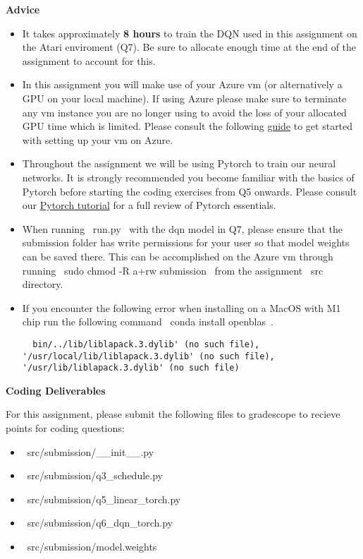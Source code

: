 \textbf{Advice}
\begin{itemize}
  \item It takes approximately \textbf{8 hours} to train the DQN used in this assignment on the Atari enviroment (Q7). Be sure to allocate enough time at the end of the assignment to account for this.

  \item In this assignment you will make use of your Azure vm (or alternatively a GPU on your local machine). If using Azure please make sure to terminate any vm instance you are no longer using to avoid the loss of your allocated GPU time which is limited. Please consult the following \href{https://github.com/scpd-proed/XCS234-Handouts/blob/main/Azure/Azure%20Guide.pdf}{guide} to get started with setting up your vm on Azure.
  
  \item Throughout the assignment we will be using Pytorch to train our neural networks. It is strongly recommended you become familiar with the basics of Pytorch before starting the coding exercises from Q5 onwards. Please consult our \href{https://colab.research.google.com/drive/1BZ89PnXpzN2US_OxwuQCazucmuTpuIfS?usp=sharing}{Pytorch tutorial} for a full review of Pytorch essentials.

  \item When running ~run.py~ with the dqn model in Q7, please ensure that the submission folder has write permissions for your user so that model weights can be saved there. This can be accomplished on the Azure vm through running ~sudo chmod -R a+rw submission~ from the assignment ~src~ directory.

  \item If you encounter the following error when installing on a MacOS with M1 chip run the following command ~conda install openblas~.

  \begin{lstlisting}
  bin/../lib/liblapack.3.dylib' (no such file), '/usr/local/lib/liblapack.3.dylib' (no such file), '/usr/lib/liblapack.3.dylib' (no such file)
  \end{lstlisting}
\end{itemize}


\textbf{Coding Deliverables}

For this assignment, please submit the following files to gradescope to recieve points for coding questions:
\begin{itemize}
    \item ~src/submission/__init__.py~
    \item ~src/submission/q3_schedule.py~
    \item ~src/submission/q5_linear_torch.py~
    \item ~src/submission/q6_dqn_torch.py~
    \item ~src/submission/model.weights~
\end{itemize}  




    
